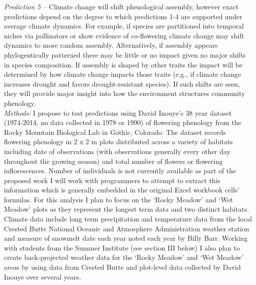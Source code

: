 \documentclass[12pt,a4paper,oneside]{article}
\begin{document}
\emph{Prediction 5 --} Climate change will shift phenological assembly, however exact predictions depend on the degree to which predictions 1-4 are supported under average climate dynamics. For example, if species are partitioned into temporal niches via pollinators or show evidence of co-flowering climate change may shift dynamics to more random assembly. Alternatively, if assembly appears phylogentically patterned there may be little or no impact given no major shifts in species composition. If assembly is shaped by other traits the impact will be determined by how climate change impacts those traits (e.g., if climate change increases drought and favors drought-resistant species). If such shifts are seen, they will provide major insight into how the environment structures community phenology.
\vspace{1.5ex}\\
\emph{Methods:} 
I propose to test predictions using David Inouye's 38 year dataset (1974-2014, no data collected in 1978 or 1990) of flowering phenology from the Rocky Mountain Biological Lab in Gothic, Colorado. The dataset records flowering phenology in 2 x 2 m plots distributed across a variety of habitats including date of observations (with observations generally every other day throughout the growing season) and total number of flowers or flowering inflorescences. Number of individuals is not currently available as part of the proposed work I will work with programmers to attempt to extract this information which is generally embedded in the original Excel workbook cells' formulas. For this analysis I plan to focus on the `Rocky Meadow' and `Wet Meadow' plots as they represent the longest term data and two distinct habitats. 
\vspace{1.5ex}\\
Climate data include long term precipitation and temperature data from the local Crested Butte National Oceanic and Atmosphere Administration weather station and measure of snowmelt date each year noted each year by Billy Barr. Working with students from the Summer Institute (see section III below) I also plan to create back-projected weather data for the `Rocky Meadow' and `Wet Meadow' areas by using data from Crested Butte and plot-level data collected by David Inouye over several years. 
\vspace{1.5ex}\\
\end{document}
